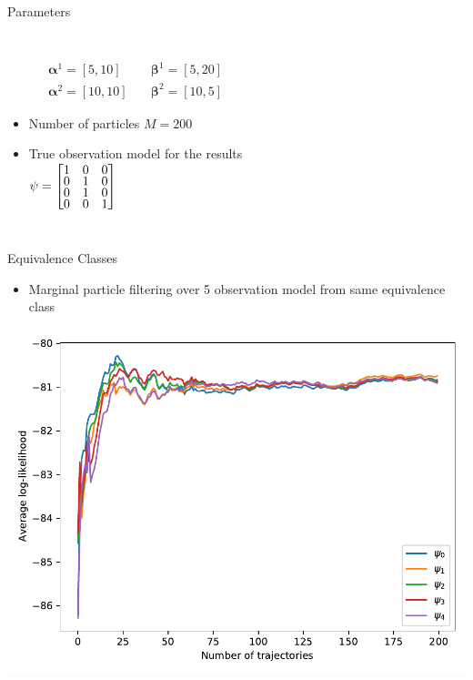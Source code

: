 \documentclass[
english,%
aspectratio=169,%
color={accentcolor=3b},
logo=true,%
colorframetitle=false,%
]{tudabeamer}
\begin{document}
\begin{frame}{Parameters}
\begin{columns}[T]
\begin{itemize}
\begin{align}
\boldsymbol{\alpha}^1 = [5,10] &\quad \boldsymbol{\beta}^1 = [5,20] \nonumber\\
\boldsymbol{\alpha}^2 = [10,10] &\quad \boldsymbol{\beta}^2 = [10,5] \nonumber
\end{align}
\item Number of particles $ M = 200 $
\item True observation model for the results\vspace{+4pt}\\
$ \psi = 
\begin{bmatrix} \vspace{-3pt}
1 & 0 & 0 \\  \vspace{-3pt}
0 & 1 & 0 \\  \vspace{-3pt}
0 & 1 & 0 \\  \vspace{-2pt}
0 & 0 & 1
\end{bmatrix} $

\end{itemize}
\end{columns}
\end{frame}


\begin{frame}{Equivalence Classes}
\begin{itemize}
	\item Marginal particle filtering over 5 observation model from same equivalence class
\end{itemize}
\centering
\includegraphics[height=0.6\textheight]{figures/llh_particleFilter_sameclass}
\end{frame}
\end{document}
